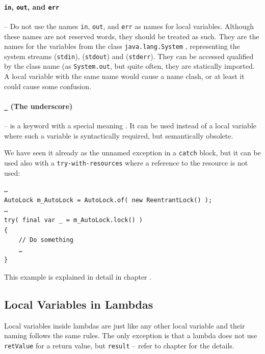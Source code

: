 \paragraph{\lstinline|in|, \lstinline|out|, and \lstinline|err|}– Do not use the names \lstinline|in|, \lstinline|out|, and \lstinline|err| as names for local variables. Although these names are not reserved words, they should be treated as such. They are the names for the variables from the class \lstinline|java.lang.System| \autocite{ORACLE_DOC_SYSTEM_CLASS}, representing the system streams  (\verb#stdin#),  (\verb#stdout#) and  (\verb#stderr#). They can be accessed qualified by the class name (as \lstinline|System.out|, but quite often, they are statically imported. A local variable with the same name would cause a name clash, or at least it could cause some confusion.

\paragraph{\lstinline|_| (The underscore)}– is a keyword \autocite{ORACLE_DOC_LANGUAGE_SPECIFICATION:Keywords} with a special meaning \autocite{ORACLE_DOC_LANGUAGE_SPECIFICATION:Declarations}. It can be used instead of a local variable where such a variable is syntactically required, but semantically obsolete.

We have seen it already as the unnamed exception in a \lstinline|catch| block, but it can be used also with a \verb#try-with-resources# where a reference to the resource is not used:
\begin{lstlisting}
…
AutoLock m_AutoLock = AutoLock.of( new ReentrantLock() );
…
try( final var _ = m_AutoLock.lock() )
{
    // Do something
    …
}
\end{lstlisting}
This example is explained in detail in chapter .


\subsection{Local Variables in Lambdas}
Local variables inside lambdas are just like any other local variable and their naming follows the same rules. The only exception is that a lambda does not use \lstinline|retValue| for a return value, but \lstinline|result| – refer to chapter  for the details.

